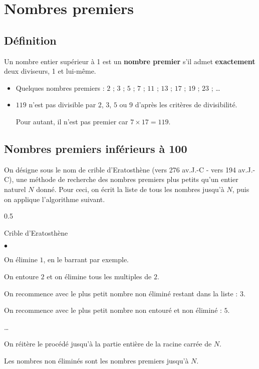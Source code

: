 \section{Nombres premiers}
\subsection{Définition}
\begin{definition}
	Un nombre entier supérieur à 1 est un \textbf{nombre premier} s'il admet \textbf{exactement} deux diviseurs, 1 et lui-même.
\end{definition}

\begin{remarque}
	\begin{itemize}
		\item Quelques nombres premiers : $2$ ; $3$ ; $5$ ; $7$ ; $11$ ; $13$ ; $17$ ; $19$ ; $23$ ; \ldots
		\item $119$ n'est pas divisible par $2$, $3$, $5$ ou $9$ d'après les critères de divisibilité.
		
		Pour autant, il n'est pas premier car $7\times 17 = 119$. 
	\end{itemize}
\end{remarque}	

\subsection{Nombres premiers inférieurs à 100}
	On désigne sous le nom de crible d'Eratosthène (vers 276 av.J.-C - vers 194 av.J.-C),
    une méthode de recherche des nombres premiers plus petits qu'un entier naturel $N$ donné.
    \smallskip
    Pour ceci, on écrit la liste de tous les nombres jusqu'à $N$, puis on applique l'algorithme suivant.
	\begin{spacing}{0.5}
    \begin{myBox}{Crible d'Eratosthène}		
        \begin{list}{$\bullet$}{}
            \item On élimine $1$, en le barrant par exemple.
            \item On entoure $2$ et on élimine tous les multiples de $2$.
            \item On recommence avec le plus petit nombre non éliminé restant dans la liste : $3$.
            \item On recommence avec le plus petit nombre non entouré et non éliminé : $5$.
            \item \dots
            \item On réitère le procédé jusqu'à la partie entière de la racine carrée de $N$.
        \end{list}
    \end{myBox}
	\end{spacing}
    Les nombres non éliminés sont les nombres premiers jusqu'à $N$.

